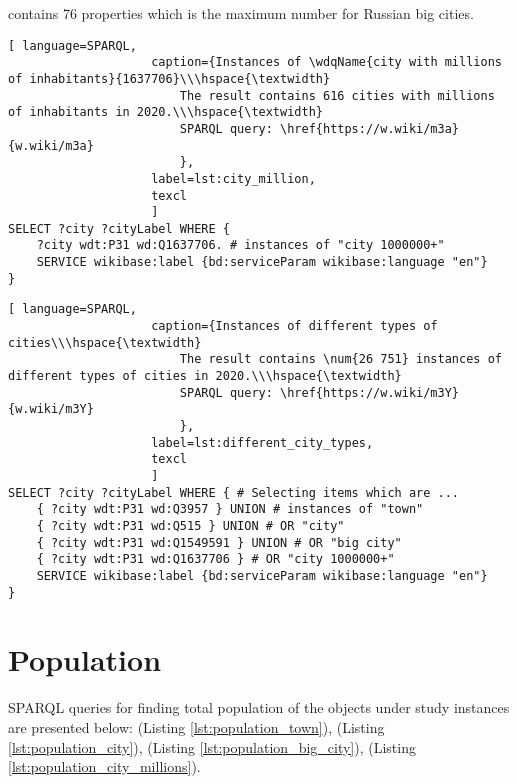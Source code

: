 contains 76 properties which is the maximum number for Russian big cities.

\begin{lstlisting}[ language=SPARQL, 
                    caption={Instances of \wdqName{city with millions of inhabitants}{1637706}\\\hspace{\textwidth}
                        The result contains 616 cities with millions of inhabitants in 2020.\\\hspace{\textwidth}
                        SPARQL query: \href{https://w.wiki/m3a}{w.wiki/m3a}
                        },
                    label=lst:city_million,
                    texcl 
                    ]
SELECT ?city ?cityLabel WHERE {
	?city wdt:P31 wd:Q1637706. # instances of "city 1000000+" 
	SERVICE wikibase:label {bd:serviceParam wikibase:language "en"}
}
\end{lstlisting}%

\begin{lstlisting}[ language=SPARQL, 
                    caption={Instances of different types of cities\\\hspace{\textwidth}
                        The result contains \num{26 751} instances of different types of cities in 2020.\\\hspace{\textwidth}
                        SPARQL query: \href{https://w.wiki/m3Y}{w.wiki/m3Y}
                        },
                    label=lst:different_city_types,
                    texcl 
                    ]
SELECT ?city ?cityLabel WHERE { # Selecting items which are ...
	{ ?city wdt:P31 wd:Q3957 } UNION # instances of "town"
	{ ?city wdt:P31 wd:Q515 } UNION # OR "city"
	{ ?city wdt:P31 wd:Q1549591 } UNION # OR "big city"
	{ ?city wdt:P31 wd:Q1637706 } # OR "city 1000000+"                                
	SERVICE wikibase:label {bd:serviceParam wikibase:language "en"}
}
\end{lstlisting}%

\section{Population}

SPARQL queries for finding total population of the objects under study instances are presented below:  (Listing \ref{lst:population_town}),  (Listing \ref{lst:population_city}),  (Listing \ref{lst:population_big_city}),  (Listing \ref{lst:population_city_millions}).

